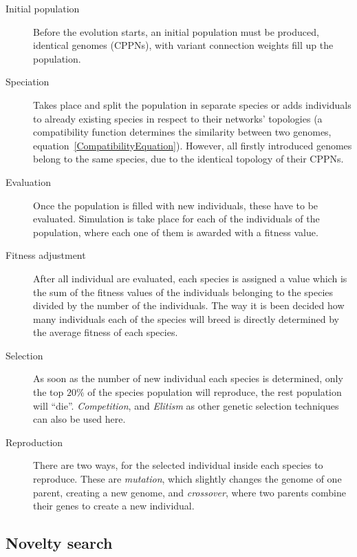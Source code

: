 \begin{description}
\item[Initial population]{Before the evolution starts, an initial population must be produced, identical genomes (CPPNs), with variant connection weights fill up the population.}

\item[Speciation]{Takes place and split the population in separate species or adds individuals to already existing species in respect to their networks' topologies (a compatibility function determines the similarity between two genomes, equation~\ref{CompatibilityEquation}). However, all firstly introduced genomes belong to the same species, due to the identical topology of their CPPNs.}

\item[Evaluation] Once the population is filled with new individuals, these have to be evaluated. Simulation is take place for each of the individuals of the population, where each one of them is awarded with a fitness value.

\item[Fitness adjustment]{After all individual are evaluated, each species is assigned a value which is the sum of the fitness values of the individuals belonging to the species divided by the number of the individuals. The way it is been decided how many individuals each of the species will breed is directly determined by the average fitness of each species.}

\item[Selection]{As soon as the number of new individual each species is determined, only the top $20\%$ of the species population will reproduce, the rest population will ``die''. \emph{Competition}, and \emph{Elitism} as other genetic selection techniques can also be used here.}

\item[Reproduction]{There are two ways, for the selected individual inside each species to reproduce. These are \emph{mutation}, which slightly changes the genome of one parent,  creating a new genome, and \emph{crossover}, where two parents combine their genes to create a new individual.}
\end{description}






\subsection{Novelty search}


